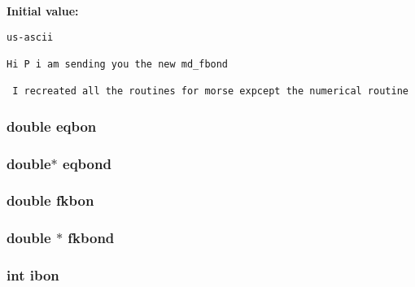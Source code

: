 \subsubsection{}\label{md__fmorse_8c_8bd4accafd4e712317ed9a471738a971}


{\bf Initial value:}

\footnotesize\begin{verbatim}us-ascii

Hi P i am sending you the new md_fbond

 I recreated all the routines for morse expcept the numerical routine
\end{verbatim}\normalsize 
{}
\subsubsection{\setlength{\rightskip}{0pt plus 5cm}double {\bf eqbon}}\label{md__fmorse_8c_d5f2b7cab4f47359d6dd1e5c95646bbe}


\subsubsection{\setlength{\rightskip}{0pt plus 5cm}double$\ast$ {\bf eqbond}}\label{md__fmorse_8c_21f64656342a42d1a4f2e4cd9ee3a6b8}


\subsubsection{\setlength{\rightskip}{0pt plus 5cm}double {\bf fkbon}}\label{md__fmorse_8c_330b11f839cbd7eac7aa585f3ba124d2}


\subsubsection{\setlength{\rightskip}{0pt plus 5cm}double $\ast$ {\bf fkbond}}\label{md__fmorse_8c_dc841d3ec25a22f536851952f173744b}


\subsubsection{\setlength{\rightskip}{0pt plus 5cm}int {\bf ibon}}\label{md__fmorse_8c_7772ba96c7f56ca873cb228c2b1760e3}



